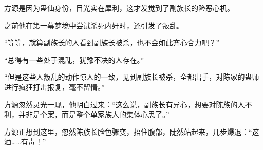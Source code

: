 \begin{this_body}
方源是因为蛊仙身份，目光实在犀利，这才发觉到了副族长的险恶心机。

之前他在第一幕梦境中尝试杀死内奸时，还引发了叛乱。

“等等，就算副族长的人看到副族长被杀，也不会如此齐心合力吧？”

“总得有一些处于混乱，犹豫不决的人存在。”

“但是这些人叛乱的动作惊人的一致，见到副族长被杀，全都出手，对陈家的蛊师进行疯狂打击报复，毫不留情。”

方源忽然灵光一现，他明白过来：“这么说，副族长有异心，想要对陈族的人不利，并非是个案，而是整个单家族人的集体心思了。”

方源正想到这里，忽然陈族长脸色骤变，捂住腹部，陡然站起来，几步爆退：“这酒……有毒！”

\end{this_body}

